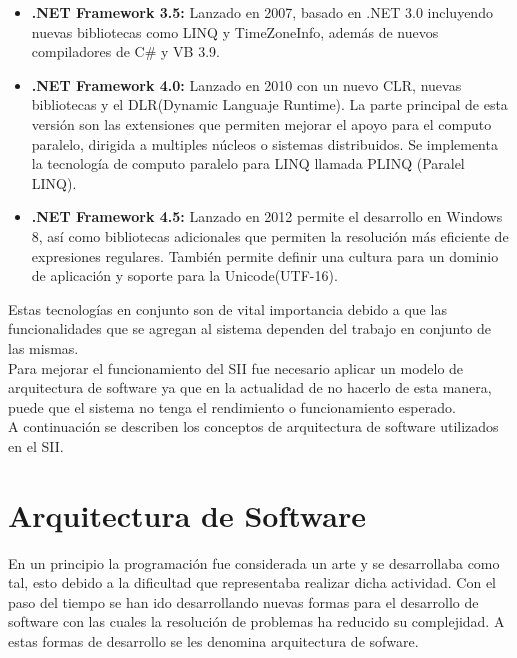 \begin{itemize}
			\item \textbf{.NET Framework 3.5: } Lanzado en 2007, basado en .NET 3.0 incluyendo nuevas bibliotecas como LINQ y TimeZoneInfo, adem\'as de nuevos compiladores de C\# y VB 3.9.

			\item \textbf{.NET Framework 4.0: } Lanzado en 2010 con un nuevo CLR, nuevas bibliotecas y el DLR(Dynamic Languaje Runtime). La parte principal de esta versi\'on son las extensiones que permiten mejorar el apoyo para el computo paralelo, dirigida a multiples n\'ucleos o sistemas distribuidos. Se implementa la tecnolog\'ia de computo paralelo para LINQ llamada PLINQ (Paralel LINQ).

			\item \textbf{.NET Framework 4.5: } Lanzado en 2012 permite el desarrollo en Windows 8, as\'i como bibliotecas adicionales que permiten la resoluci\'on m\'as eficiente de expresiones regulares. Tambi\'en permite definir una cultura para un dominio de aplicaci\'on y soporte para la Unicode(UTF-16).

		\end{itemize}

Estas tecnolog\'ias en conjunto son de vital importancia debido a que las funcionalidades que se agregan al sistema dependen del trabajo en conjunto de las mismas.\\

Para mejorar el funcionamiento del SII fue necesario aplicar un modelo  de arquitectura de software ya que en la actualidad de no hacerlo de esta manera, puede que el sistema no tenga el rendimiento o funcionamiento esperado.\\

A continuaci\'on se describen los conceptos de arquitectura de software utilizados en el SII.\\



\section{Arquitectura de Software}

	En un principio la programaci\'on fue considerada un arte  y se desarrollaba como tal, esto debido a la dificultad que representaba realizar dicha actividad. Con el paso del tiempo se han ido desarrollando nuevas formas para el desarrollo de software con las cuales la resoluci\'on de problemas ha reducido su complejidad. A estas formas de desarrollo se les denomina arquitectura de sofware.\\

